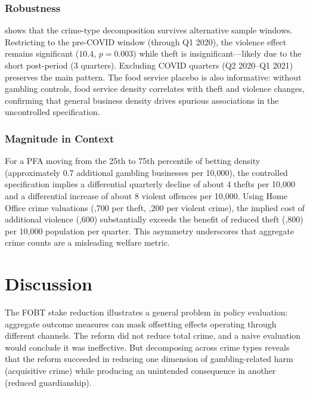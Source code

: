 \documentclass[12pt]{article}
\begin{document}
\subsubsection*{Robustness}  shows that the crime-type decomposition survives alternative sample windows. Restricting to the pre-COVID window (through Q1 2020), the violence effect remains significant ($10.4$, $p = 0.003$) while theft is insignificant---likely due to the short post-period (3 quarters). Excluding COVID quarters (Q2 2020--Q1 2021) preserves the main pattern. The food service placebo is also informative: without gambling controls, food service density correlates with theft and violence changes, confirming that general business density drives spurious associations in the uncontrolled specification.

\subsubsection*{Magnitude in Context} For a PFA moving from the 25th to 75th percentile of betting density (approximately 0.7 additional gambling businesses per 10,000), the controlled specification implies a differential quarterly decline of about 4 thefts per 10,000 and a differential increase of about 8 violent offences per 10,000. Using Home Office crime valuations (,700 per theft, ,200 per violent crime), the implied cost of additional violence (,600) substantially exceeds the benefit of reduced theft (,800) per 10,000 population per quarter. This asymmetry underscores that aggregate crime counts are a misleading welfare metric.


\section{Discussion}

The FOBT stake reduction illustrates a general problem in policy evaluation: aggregate outcome measures can mask offsetting effects operating through different channels. The reform did not reduce total crime, and a naive evaluation would conclude it was ineffective. But decomposing across crime types reveals that the reform succeeded in reducing one dimension of gambling-related harm (acquisitive crime) while producing an unintended consequence in another (reduced guardianship).
\end{document}
